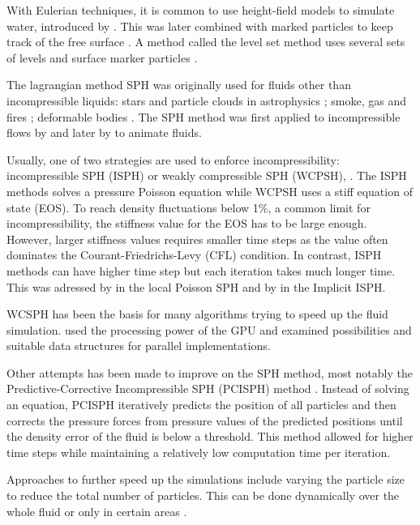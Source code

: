 \documentclass[../../main.tex]{subfiles}
\begin{document}
\tracingall

With Eulerian techniques, it is common to use height-field models to simulate water, introduced by \citet{kass1990rapid}. This was later combined with marked particles to keep track of the free surface \citep{foster1996realistic}. A method called the level set method uses several sets of levels and surface marker particles \citep{enright2002hybrid}. 

The lagrangian method SPH was originally used for fluids other than incompressible liquids: stars and particle clouds in astrophysics \citep{lucy1977numerical, gingold1977smoothed}; smoke, gas and fires \citep{stam1995depicting}; deformable bodies \citep{desbrun1996smoothed}. The SPH method was first applied to incompressible flows by \citet{monaghan1994simulating} and later by \citet{muller2003particle} to animate fluids. 

Usually, one of two strategies are used to enforce incompressibility: incompressible SPH (ISPH) or weakly compressible SPH (WCPSH), \citep{becker2007weakly}. The ISPH methods solves a pressure Poisson equation while WCPSH uses a stiff equation of state (EOS). To reach density fluctuations below 1\%, a common limit for incompressibility, the stiffness value for the EOS has to be large enough. However, larger stiffness values requires smaller time steps as the value often dominates the Courant-Friedrichs-Levy (CFL) condition. In contrast, ISPH methods can have higher time step but each iteration takes much longer time. This was adressed by \citet{he2012local} in the local Poisson SPH and by \citet{ihmsen2014implicit} in the Implicit ISPH. 

WCSPH has been the basis for many algorithms trying to speed up the fluid simulation. \citet{goswami2010interactive} used the processing power of the GPU and \citet{ihmsen2011parallel} examined possibilities and suitable data structures for parallel implementations. 

Other attempts has been made to improve on the SPH method, most notably the Predictive-Corrective Incompressible SPH (PCISPH) method \citep{solenthaler2009predictive}. Instead of solving an equation, PCISPH iteratively predicts the position of all particles and then corrects the pressure forces from pressure values of the predicted positions until the density error of the fluid is below a threshold. This method allowed for higher time steps while maintaining a relatively low computation time per iteration. 

Approaches to further speed up the simulations include varying the particle size to reduce the total number of particles. This can be done dynamically over the whole fluid \citep{adams2007adaptively,hong2008adaptive} or only in certain areas \citep{solenthaler2011two,horvath2013mass}. 
\end{document}

